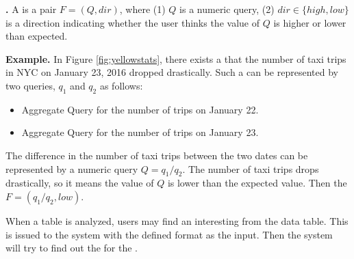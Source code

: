 {\bf {\Fact}.} A {\fact} is a pair $F = (Q, dir)$, where (1) $Q$ is a numeric query, (2) $dir \in \{high, low\}$ is a direction indicating whether the user thinks the value of $Q$ is higher or lower than expected.

{\bf Example.} In Figure \ref{fig:yellowstats}, there exists a {\fact} that the number of taxi trips in NYC on January 23, 2016 dropped drastically. Such a {\fact} can be represented by two queries, $q_1$ and $q_2$ as follows:
\begin{itemize}
	\item Aggregate Query for the number of trips on January 22.
	\item Aggregate Query for the number of trips on January 23.
\end{itemize}

The difference in the number of taxi trips between the two dates can be represented by a numeric query $Q = {q_1} / {q_2}$. The number of taxi trips drops drastically, so it means the value of $Q$ is lower than the expected value. Then the {\fact} $F = ({q_1} / {q_2}, low)$.

When a table is analyzed, users may find an interesting {\fact} from the data table. This {\fact} is issued to the system with the defined format as the input. Then the system will try to find out the {\explanation} for the {\fact}.


